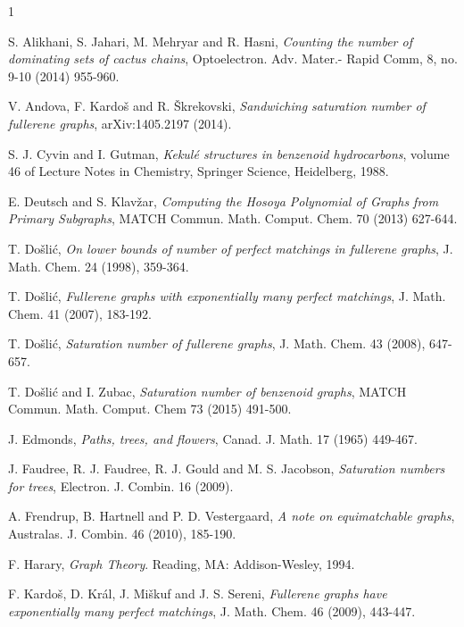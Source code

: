 \documentclass[11pt]{article}
\begin{document}
\begin{thebibliography}{1}

       S. Alikhani, S. Jahari, M. Mehryar and R. Hasni, {\it Counting the number of dominating sets of cactus chains}, Optoelectron. Adv. Mater.- Rapid Comm, 8, no. 9-10 (2014) 955-960.

       V. Andova, F. Kardo\v s and R. \v Skrekovski, {\it Sandwiching saturation number of fullerene graphs}, arXiv:1405.2197 (2014).


       S. J. Cyvin and I. Gutman, {\it Kekul\'e structures in benzenoid hydrocarbons}, volume 46 of Lecture
Notes in Chemistry, Springer Science, Heidelberg, 1988.

      E.  Deutsch and S. Klav\v zar, {\it Computing the Hosoya Polynomial of Graphs from Primary Subgraphs}, MATCH Commun. Math. Comput. Chem. 70 (2013) 627-644.

       T. Do\v sli\'c, {\it On lower bounds of number of perfect matchings in fullerene graphs}, J. Math. Chem.
24 (1998), 359-364.

      T. Do\v sli\'c, {\it Fullerene graphs with exponentially many perfect matchings}, J. Math. Chem. 41
(2007), 183-192.

     T. Do\v sli\'c, {\it Saturation number of fullerene graphs}, J. Math. Chem. 43 (2008), 647-657.

       T. Do\v sli\'c and I. Zubac, {\it Saturation number of benzenoid graphs}, MATCH Commun. Math. Comput. Chem 73 (2015) 491-500.

       J. Edmonds, {\it Paths, trees, and flowers}, Canad. J. Math. 17 (1965) 449-467.

      J. Faudree, R. J. Faudree, R. J. Gould and M. S. Jacobson, {\it Saturation numbers for trees}, Electron.
J. Combin. 16 (2009).

      A. Frendrup, B. Hartnell and P. D. Vestergaard, {\it A note on equimatchable graphs}, Australas. J. Combin. 46 (2010), 185-190.

      F. Harary, {\it Graph Theory}. Reading, MA: Addison-Wesley, 1994.   

      F. Kardo\v s, D. Kr\'al, J. Mi\v skuf and J. S. Sereni, {\it  Fullerene graphs have exponentially many perfect
matchings}, J. Math. Chem. 46 (2009), 443-447.


\end{thebibliography}
\end{document}
